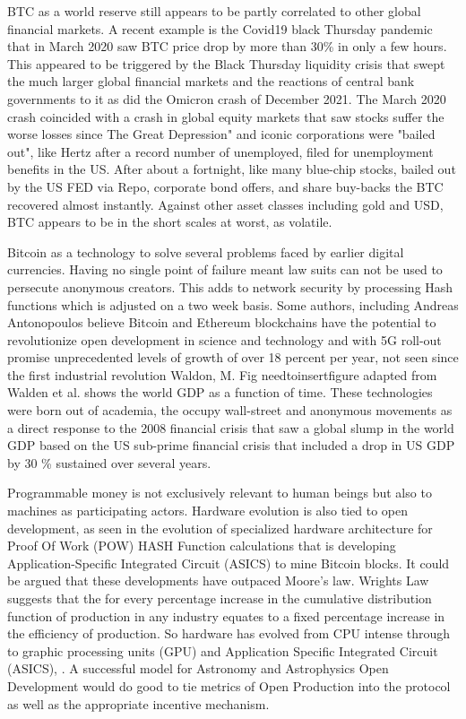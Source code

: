 \documentclass[final,5p,times,twocolumn,authoryear]{elsarticle}
\begin{document}
BTC as a world reserve still appears to be partly correlated to other global financial markets. A recent example is the Covid19 black Thursday pandemic that in March 2020 saw BTC price drop by more than 30\% in only a few hours. This appeared to be triggered by the Black Thursday liquidity crisis that swept the much larger global financial markets and the reactions of central bank governments to it as did the Omicron crash of December 2021. The March 2020 crash coincided with a crash in global equity markets that saw stocks suffer the worse losses since The Great Depression" and iconic corporations were "bailed out", like Hertz after a record number of unemployed, filed for unemployment benefits in the US. After about a fortnight, like many blue-chip stocks, bailed out by the US FED via Repo, corporate bond offers, and share buy-backs the BTC recovered almost instantly. Against other asset classes including gold and USD, BTC appears to be in the short scales at worst, as volatile. 
 
Bitcoin as a technology to solve several problems faced by earlier digital currencies. Having no single point of failure meant law suits can not be used to persecute anonymous creators. This adds to network security by processing Hash functions which is adjusted on a two week basis. Some authors, including Andreas Antonopoulos believe Bitcoin and Ethereum blockchains have the potential to revolutionize open development in science and technology and with 5G roll-out promise unprecedented levels of growth of over 18 percent per year, not seen since the first industrial revolution Waldon, M.  Fig needtoinsertfigure adapted from Walden et al. shows the world GDP as a function of time. These technologies were born out of academia, the occupy wall-street and anonymous movements as a direct response to the 2008 financial crisis that saw a global slump in the world GDP based on the US sub-prime financial crisis  that included a drop in US GDP by 30 \% sustained over several years.
 
Programmable money is not exclusively relevant to human beings but also to machines as participating actors. Hardware evolution is also tied to open development, as seen in the evolution of specialized hardware architecture for Proof Of Work (POW) HASH Function calculations that is developing Application-Specific Integrated Circuit (ASICS) to mine Bitcoin blocks. It could be argued that these developments have outpaced Moore's law.  Wrights Law suggests that the for every percentage increase in the cumulative distribution function of production in any industry equates to a fixed percentage increase in the efficiency of production. So hardware has evolved from CPU intense through to graphic processing units (GPU) and  Application Specific Integrated Circuit  (ASICS), \cite{10.1371/journal.pone.0052669}. A successful model for Astronomy and Astrophysics Open Development would do good to tie metrics of Open Production into the protocol as well as the appropriate incentive mechanism.       
\end{document}
